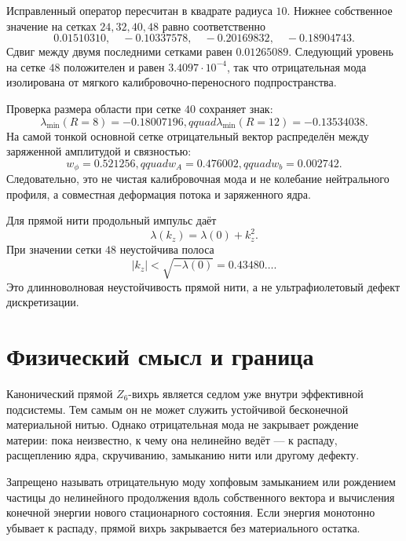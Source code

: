 Исправленный оператор пересчитан в квадрате радиуса $10$. Нижнее
собственное значение на сетках $24,32,40,48$ равно соответственно
\begin{equation}
 0.01510310,\quad -0.10337578,\quad
 -0.20169832,\quad -0.18904743.
 \label{eq:v6-negative-mode-convergence}
\end{equation}
Сдвиг между двумя последними сетками равен $0.01265089$. Следующий уровень
на сетке $48$ положителен и равен $3.4097\cdot10^{-4}$, так что
отрицательная мода изолирована от мягкого калибровочно-переносного
подпространства.

Проверка размера области при сетке $40$ сохраняет знак:
\begin{equation}
 \lambda_{\min}(R=8)=-0.18007196,qquad
 \lambda_{\min}(R=12)=-0.13534038.
\end{equation}
На самой тонкой основной сетке отрицательный вектор распределён между
заряженной амплитудой и связностью:
\begin{equation}
 w_\phi=0.521256,qquad
 w_A=0.476002,qquad
 w_b=0.002742.
\end{equation}
Следовательно, это не чистая калибровочная мода и не колебание
нейтрального профиля, а совместная деформация потока и заряженного ядра.

Для прямой нити продольный импульс даёт
\begin{equation}
 \lambda(k_z)=\lambda(0)+k_z^2.
\end{equation}
При значении сетки $48$ неустойчива полоса
\begin{equation}
 |k_z|<\sqrt{-\lambda(0)}=0.43480\ldots.
\end{equation}
Это длинноволновая неустойчивость прямой нити, а не ультрафиолетовый
дефект дискретизации.

\section{Физический смысл и граница}

Канонический прямой $Z_6$-вихрь является седлом уже внутри эффективной
подсистемы. Тем самым он не может служить устойчивой бесконечной
материальной нитью. Однако отрицательная мода не закрывает рождение
материи: пока неизвестно, к чему она нелинейно ведёт --- к распаду,
расщеплению ядра, скручиванию, замыканию нити или другому дефекту.

\begin{nogocriterion}
Запрещено называть отрицательную моду хопфовым замыканием или рождением
частицы до нелинейного продолжения вдоль собственного вектора и
вычисления конечной энергии нового стационарного состояния. Если энергия
монотонно убывает к распаду, прямой вихрь закрывается без материального
остатка.
\end{nogocriterion}

